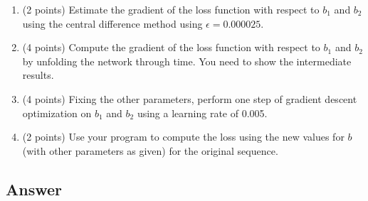 \documentclass[
	12pt, %
]{../Template/fphw}
\begin{document}
\begin{problem}
\begin{enumerate}[label=(\arabic*)]
    \item (2 points) Estimate the gradient of the loss function with respect to \(b_1\) and \(b_2\) using the central difference method using \(\epsilon=0.000025\).
    \item (4 points) Compute the gradient of the loss function with respect to \(b_1\) and \(b_2\) by unfolding the network through time. You need to show the intermediate results.
    \item (4 points) Fixing the other parameters, perform one step of gradient descent optimization on \(b_1\) and \(b_2\) using a learning rate of 0.005.
    \item (2 points) Use your program to compute the loss using the new values for \(b\) (with other parameters as given) for the original sequence.
\end{enumerate}
\end{problem}


\subsection*{Answer}
\end{document}
